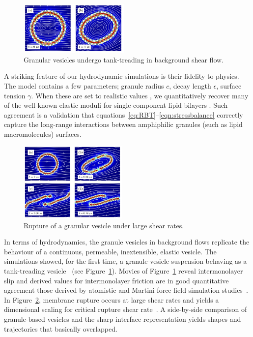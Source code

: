 \begin{figure}
\vspace{-5pt}
\includegraphics[width=0.48\textwidth]{figures/PreliminaryWork/TankTreading.jpg}
\vspace{-20pt}
\caption{\label{fig:JPv_linearshear} \footnotesize Granular vesicles
  undergo tank-treading in background shear flow.}
\end{figure}
%
A striking feature of our hydrodynamic simulations is their fidelity to
physics. The model contains a few parameters; granule radius $c$, decay
length $\epsilon$, surface tension $\gamma$. When these are set to
realistic values \cite{Fu2018_SIAM, ErLjCl89, Lin2005, Parsegian,
Israelachvili80, GarciaSaez, KUZMIN2005, Petelska2012,Jackson2016}, we
quantitatively recover many of the well-known elastic moduli for
single-component lipid bilayers \cite{Nagle17, Nagle17-2,
LeVeWa14,NAGLE2000159}. Such agreement is a validation that
equations~\eqref{eq:RBT}--\eqref{eqn:stressbalance} correctly capture
the long-range interactions between amphiphilic granules (such as lipid
macromolecules) surfaces.
\begin{figure}
\vspace{-10pt}
\includegraphics[width=0.475\textwidth]{figures/PreliminaryWork/Rupture.jpg}
\caption{\label{fig:JPv_rupture} \footnotesize Rupture of a granular
  vesicle under large shear rates.}
\end{figure}

In terms of hydrodynamics, the granule vesicles in background flows
replicate the behaviour of a continuous, permeable, inextensible,
elastic vesicle. The simulations showed, for the first time, a
granule-vesicle suspension behaving as a tank-treading
vesicle~\cite{Finken2008, Shaqfeh11} (see
Figure~\ref{fig:JPv_linearshear}). Movies of
Figure~\ref{fig:JPv_linearshear} reveal intermonolayer slip and derived
values for intermonolayer friction are in good quantitative agreement
those derived by atomistic and Martini force field simulation
studies~\cite{WuoEd06, denOtter2007, SHKULIPA2005823, Zgorski2019}. In
Figure~\ref{fig:JPv_rupture}, membrane rupture occurs at large shear
rates and yields a dimensional scaling for critical rupture shear
rate~\cite{VLAHOVSKA2009775, keller_skalak_1982}. A side-by-side
comparison of granule-based vesicles and the sharp interface
representation yields shapes and trajectories that basically overlapped.

